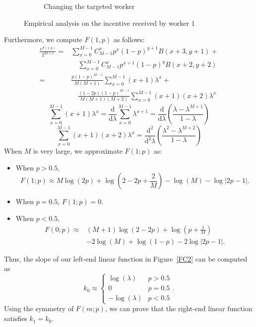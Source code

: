 \documentclass{article}
\begin{document}
\begin{figure}[t]
\begin{subfigure}[t]{0.32\textwidth}
        \caption{\label{BPP3}Changing the targeted worker}
    \end{subfigure}
    \caption{\label{BPP}Empirical analysis on the incentive received by worker $1$}
\end{figure}

Furthermore, we compute $F(1,p)$ as follows:
\begin{equation*}
\begin{split}
\frac{e^{F(1;p)}}{2^{M+1}}=&\sum_{x=0}^{M-1}C_{M-1}^{x}p^{x}(1-p)^{y+1}B(x+3,y+1)+\\
&\quad \sum_{x=0}^{M-1}C_{M-1}^{x}p^{x+1}(1-p)^{y}B(x+2,y+2)\\
=&\frac{p(1-p)^{M-1}}{M(M+1)}\sum_{x=0}^{M-1}(x+1)\lambda^x + \\
&\quad \frac{(1-2p)(1-p)^{M-1}}{M(M+1)(M+2)}\sum_{x=0}^{M-1}(x+1)(x+2)\lambda^{x}
\end{split}
\end{equation*}
\begin{equation*}
\sum_{x=0}^{M-1}(x+1)\lambda^x =\frac{\mathrm{d}}{\mathrm{d}\lambda}\sum_{x=0}^{M-1}\lambda^{x+1} =\frac{\mathrm{d}}{\mathrm{d}\lambda}\left( \frac{\lambda-\lambda^{M+1}}{1-\lambda}\right)
\end{equation*}
\begin{equation*}
\sum_{x=0}^{M-1}(x+1)(x+2)\lambda^{x} =\frac{\mathrm{d}^2}{\mathrm{d}^2\lambda}\left( \frac{\lambda^2-\lambda^{M+2}}{1-\lambda}\right)
\end{equation*}
When $M$ is very large, we approximate $F(1;p)$ as:
{\color{red}
\begin{itemize}
\item When $p>0.5$, 
\begin{equation*}
F(1;p)\approx M\log(2p)+\log(2-2p+\frac{2}{M})-\log(M)-\log|2p-1|.
\end{equation*}
\item When $p=0.5$, $F(1;p)=0$.
\item When $p<0.5$,
\begin{equation*}
\begin{split}
F(0;p)\approx &(M+1)\log(2-2p)+\log(p+\frac{1}{M})\\
&-2\log(M)+\log(1-p)-2\log|2p-1|.
\end{split}
\end{equation*}
\end{itemize}
}
Thus, the slope of our left-end linear function in Figure~\ref{FC2} can be computed as
\begin{equation}
   k_0\approx
    \left\{
    \begin{array}{cl}
    \log(\lambda) & p>0.5\\
    0 & p=0.5\\
    -\log(\lambda) & p<0.5
    \end{array}\right..
\end{equation}
Using the symmetry of $F(m;p)$, we can prove that the right-end linear function satisfies $k_1=k_0$.
\end{document}
